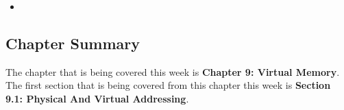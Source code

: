 \begin{itemize}
    \item {} \textbullet {} 
\end{itemize}

\subsection{Chapter Summary}

The chapter that is being covered this week is \textbf{Chapter 9: Virtual Memory}. The first section that is being covered from this chapter this week is \textbf{Section 9.1: Physical And Virtual Addressing}.

